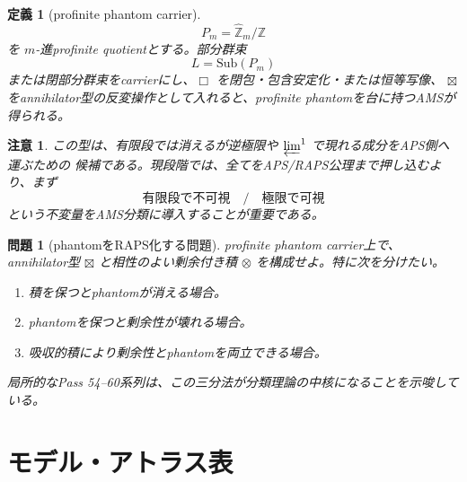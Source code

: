 \documentclass[uplatex,dvipdfmx,a4paper,10pt]{jsarticle}
\newtheorem{definition}[theorem]{定義}
\newtheorem{remark}[theorem]{注意}
\newtheorem{problem}[theorem]{問題}
\newcommand{\bt}{\boxtimes}
\newcommand{\Z}{\mathbb Z}
\begin{document}
\begin{definition}[profinite phantom carrier]
\[
P_m=\widehat{\Z}_m/\Z
\]
を \(m\)-進profinite quotientとする。部分群束
\[
L=\mathrm{Sub}(P_m)
\]
または閉部分群束をcarrierにし、\(\Box\) を閉包・包含安定化・または恒等写像、
\(\bt\) をannihilator型の反変操作として入れると、profinite phantomを台に持つAMSが得られる。
\end{definition}

\begin{remark}
この型は、有限段では消えるが逆極限や \(\varprojlim^1\) で現れる成分をAPS側へ運ぶための
候補である。現段階では、全てをAPS/RAPS公理まで押し込むより、まず
\[
\text{有限段で不可視}\quad /\quad \text{極限で可視}
\]
という不変量をAMS分類に導入することが重要である。
\end{remark}

\begin{problem}[phantomをRAPS化する問題]
profinite phantom carrier上で、annihilator型 \(\bt\) と相性のよい剰余付き積
\(\otimes\) を構成せよ。特に次を分けたい。
\begin{enumerate}
  \item 積を保つとphantomが消える場合。
  \item phantomを保つと剰余性が壊れる場合。
  \item 吸収的積により剰余性とphantomを両立できる場合。
\end{enumerate}
局所的なPass 54--60系列は、この三分法が分類理論の中核になることを示唆している。
\end{problem}

\section{モデル・アトラス表}
\end{document}
